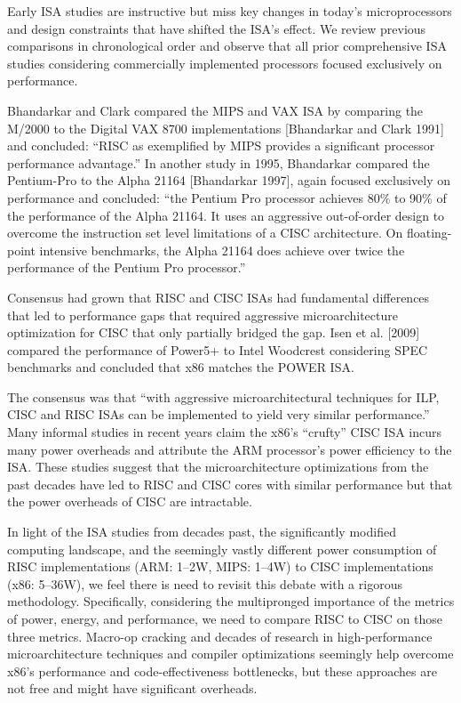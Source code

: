 \label{sec:related}

Early ISA studies are instructive but miss key changes in today’s
microprocessors and design constraints that have shifted the ISA’s effect. We review
previous comparisons in chronological order and observe that all prior comprehensive
ISA studies considering commercially implemented processors focused exclusively on
performance.

Bhandarkar and Clark compared the MIPS and VAX ISA by comparing the M/2000 to
the Digital VAX 8700 implementations [Bhandarkar and Clark 1991] and concluded:
“RISC as exemplified by MIPS provides a significant processor performance advantage.”
In another study in 1995, Bhandarkar compared the Pentium-Pro to the Alpha
21164 [Bhandarkar 1997], again focused exclusively on performance and concluded:
“the Pentium Pro processor achieves 80\% to 90\% of the performance of the Alpha
21164. It uses an aggressive out-of-order design to overcome the instruction set level
limitations of a CISC architecture. On floating-point intensive benchmarks, the Alpha
21164 does achieve over twice the performance of the Pentium Pro processor.” 

Consensus had grown that RISC and CISC ISAs had fundamental differences that led to
performance gaps that required aggressive microarchitecture optimization for CISC
that only partially bridged the gap. Isen et al. [2009] compared the performance of Power5+ to Intel Woodcrest considering SPEC benchmarks and concluded that x86 matches the POWER ISA. 

The consensus was that “with aggressive microarchitectural techniques for ILP, CISC and
RISC ISAs can be implemented to yield very similar performance.” Many informal studies in recent years claim the x86’s “crufty” CISC ISA incurs many power overheads and attribute the ARM processor’s power efficiency to the ISA. These studies suggest that the microarchitecture optimizations from the past decades have led to RISC and CISC cores with similar performance but that the power overheads of CISC are intractable.

In light of the ISA studies from decades past, the significantly modified computing
landscape, and the seemingly vastly different power consumption of RISC implementations
(ARM: 1–2W, MIPS: 1–4W) to CISC implementations (x86: 5–36W), we feel there
is need to revisit this debate with a rigorous methodology. Specifically, considering the
multipronged importance of the metrics of power, energy, and performance, we need to
compare RISC to CISC on those three metrics. Macro-op cracking and decades of research
in high-performance microarchitecture techniques and compiler optimizations
seemingly help overcome x86’s performance and code-effectiveness bottlenecks, but these approaches are not free and might have significant overheads. 